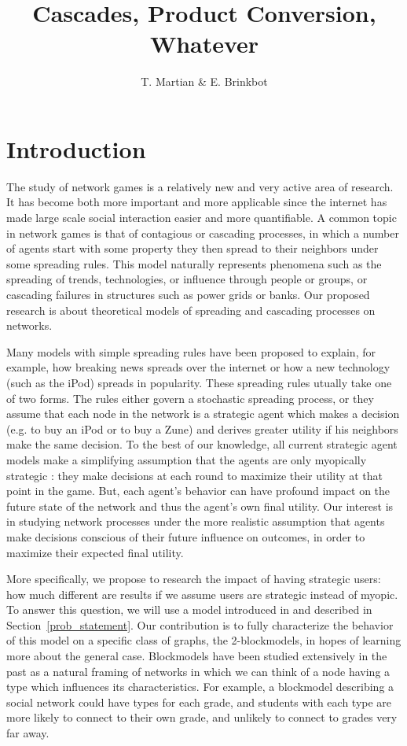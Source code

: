 \documentclass{article}
\title{Cascades, Product Conversion, Whatever}
\author{T. Martian \& E. Brinkbot}
\begin{document}
\maketitle

\section{Introduction}
\label{intro}

The study of network games is a relatively new and very active area of
research. It has become both more important and more applicable since
the internet has made large scale social interaction easier and more
quantifiable. A common topic in network games is that of contagious or
cascading processes, in which a number of agents start with some
property they then spread to their neighbors under some spreading
rules. This model naturally represents phenomena such as the spreading
of trends, technologies, or influence through people or groups, or
cascading failures in structures such as power grids or banks. Our
proposed research is about theoretical models of spreading and
cascading processes on networks.

Many models with simple spreading rules have been proposed
\cite{Arthur89, Morris00, Watts02} to explain, for example, how
breaking news spreads over the internet or how a new technology (such
as the iPod) spreads in popularity. These spreading rules utually take
one of two forms. The rules either govern a stochastic spreading
process, or they assume that each node in the network is a strategic
agent which makes a decision (e.g. to buy an iPod or to buy a Zune)
and derives greater utility if his neighbors make the same
decision. To the best of our knowledge, all current strategic agent
models make a simplifying assumption that the agents are only
myopically strategic \cite{Chierichetti12}: they make decisions at
each round to maximize their utility at that point in the game. But,
each agent's behavior can have profound impact on the future state of
the network and thus the agent's own final utility. Our interest is in
studying network processes under the more realistic assumption that
agents make decisions conscious of their future influence on outcomes,
in order to maximize their expected final utility.

More specifically, we propose to research the impact of having
strategic users: how much different are results if we assume users are
strategic instead of myopic. To answer this question, we will use a
model introduced in \cite{Chierichetti12} and described in
Section~\ref{prob_statement}. Our contribution is to fully
characterize the behavior of this model on a specific class of graphs,
the 2-blockmodels, in hopes of learning more about the general
case. Blockmodels have been studied extensively in the past
\cite{Wang87, Snijders97} as a natural framing of networks in which we
can think of a node having a type which influences its
characteristics. For example, a blockmodel describing a social network
could have types for each grade, and students with each type are more
likely to connect to their own grade, and unlikely to connect to
grades very far away.
\end{document}
